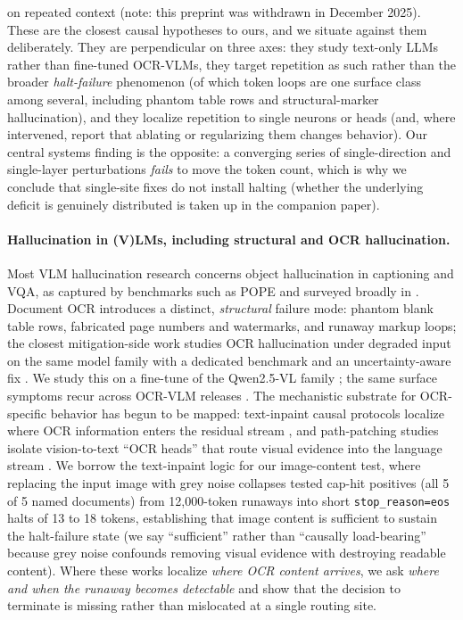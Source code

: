 \documentclass[11pt]{article}
\begin{document}
on repeated context \citep{wang2025inductiontoxicity} (note: this preprint was withdrawn in December 2025). These are the closest causal
hypotheses to ours, and we situate against them deliberately. They are perpendicular on
three axes: they study text-only LLMs rather than fine-tuned OCR-VLMs, they target
repetition as such rather than the broader \emph{halt-failure} phenomenon (of which
token loops are one surface class among several, including phantom table rows and
structural-marker hallucination), and they localize repetition to single neurons or
heads (and, where intervened, report that ablating or regularizing them changes
behavior). Our central systems finding is the opposite: a converging series of
single-direction and single-layer perturbations \emph{fails} to move the token count,
which is why we conclude that single-site fixes do not install halting (whether the
underlying deficit is genuinely distributed is taken up in the companion paper).

\paragraph{Hallucination in (V)LMs, including structural and OCR hallucination.}
Most VLM hallucination research concerns object hallucination in captioning and VQA, as
captured by benchmarks such as POPE \citep{li2023pope} and surveyed broadly in
\citet{bai2024mllmhallusurvey}. Document OCR introduces a distinct, \emph{structural}
failure mode: phantom blank table rows, fabricated page numbers and watermarks, and
runaway markup loops; the closest mitigation-side work studies OCR hallucination under
degraded input on the same model family with a dedicated benchmark and an
uncertainty-aware fix \citep{he2025seeingbelieving}. We study this on a fine-tune of the
Qwen2.5-VL family \citep{qwen25vl}; the same surface symptoms recur across OCR-VLM releases
\citep{poznanski2025olmocr,olmocrv2,internvl35,granitedocling2025}. The mechanistic
substrate for OCR-specific behavior has begun to be mapped: text-inpaint causal
protocols localize where OCR information enters the residual stream
\citep{steinberggal2026}, and path-patching studies isolate vision-to-text ``OCR heads''
that route visual evidence into the language stream \citep{baek2025}. We borrow the
text-inpaint logic for our image-content test, where replacing the input image with
grey noise collapses tested cap-hit positives (all 5 of 5 named documents) from
12{,}000-token runaways into short \texttt{stop\_reason=eos} halts of 13 to 18 tokens,
establishing that image content is sufficient to sustain the halt-failure state (we say
``sufficient'' rather than ``causally load-bearing'' because grey noise confounds removing
visual evidence with destroying readable content). Where these works localize \emph{where OCR
content arrives}, we ask \emph{where and when the runaway becomes detectable} and show that
the decision to terminate is missing rather than mislocated at a single routing site.
\end{document}
